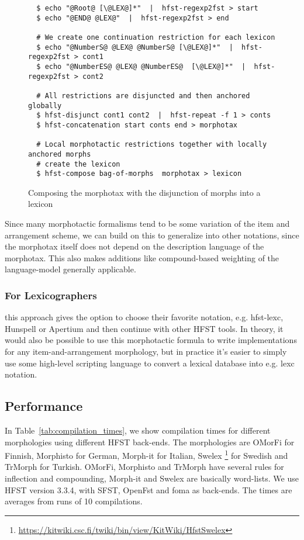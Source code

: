 \documentclass{llncs}
\begin{document}
\begin{figure} [h!]
{\scriptsize
\begin{verbatim}
  $ echo "@Root@ [\@LEX@]*"  |  hfst-regexp2fst > start
  $ echo "@END@ @LEX@"  |  hfst-regexp2fst > end

  # We create one continuation restriction for each lexicon
  $ echo "@NumberS@ @LEX@ @NumberS@ [\@LEX@]*"  |  hfst-regexp2fst > cont1
  $ echo "@NumberES@ @LEX@ @NumberES@  [\@LEX@]*"  |  hfst-regexp2fst > cont2

  # All restrictions are disjuncted and then anchored globally
  $ hfst-disjunct cont1 cont2  |  hfst-repeat -f 1 > conts
  $ hfst-concatenation start conts end > morphotax

  # Local morphotactic restrictions together with locally anchored morphs 
  # create the lexicon
  $ hfst-compose bag-of-morphs  morphotax > lexicon
\end{verbatim}
}
\caption{Composing the morphotax with the disjunction of morphs into a lexicon}
\label{fig:morphology2}
\end{figure}

Since many morphotactic formalisms tend to be some variation of the item and arrangement scheme,
we can build on this to generalize into other notations, since the morphotax itself
does not depend on the description language of the morphotax. 
This also makes additions like compound-based weighting of the language-model 
\cite{linden/2009/fsmnlp} generally applicable.

\subsubsection{For Lexicographers} this approach gives the option to
choose their favorite notation, e.g. hfst-lexc, Hunspell or Apertium and then continue with other
HFST tools. In theory, it would also be possible to use this morphotactic formula
to write implementations for any item-and-arrangement morphology, but in practice
it's easier to simply use some high-level scripting language to convert a lexical database into 
e.g. lexc notation.

\subsection{Performance}

In Table~\ref{tab:compilation_times}, we show compilation times for different 
morphologies using different HFST back-ends. The morphologies are OMorFi 
\cite{pirinen/2008} for Finnish, Morphisto \cite{zielinski/2009} for German,
Morph-it \cite{Zanchetta/2005} for Italian, Swelex 
\footnote{\url{https://kitwiki.csc.fi/twiki/bin/view/KitWiki/HfstSwelex}} 
for Swedish and TrMorph \cite{Coltekin/2010} for Turkish. 
OMorFi, Morphisto and TrMorph have several rules for
inflection and compounding, Morph-it and Swelex are basically word-lists.
We use HFST version 3.3.4, with SFST, OpenFst and foma as
back-ends. The times are averages from runs of 10 compilations.
\end{document}
